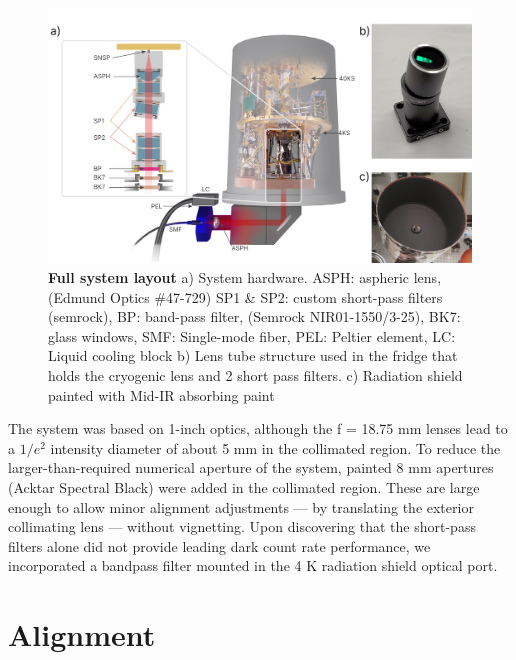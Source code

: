 \documentclass[11pt]{caltech_thesis} %
\begin{document}
\hypertarget{fig:setup}{%
\begin{figure}
\centering
\includegraphics[width=1\textwidth,height=\textheight]{./chapter_02/figs/dcrmin_layout_light.png}
\caption[{Full system layout}]{\textbf{Full system layout} a) System hardware. ASPH: aspheric lens, (Edmund Optics \#47-729)
SP1 \& SP2: custom short-pass filters (semrock), BP: band-pass filter, (Semrock NIR01-1550/3-25), BK7: glass windows, SMF: Single-mode fiber, PEL: Peltier element, LC: Liquid cooling block b) Lens tube structure used in the fridge that holds the cryogenic lens and 2 short pass filters. c) Radiation shield painted with Mid-IR absorbing paint}
\label{fig:setup}
\end{figure}
}

The system was based on 1-inch optics, although the f = 18.75 mm lenses lead to a $1/e^2$ intensity diameter of about 5 mm in the collimated region. To reduce the larger-than-required numerical aperture of the system, painted 8 mm apertures (Acktar Spectral Black) were added in the collimated region. These are large enough to allow minor alignment adjustments --- by translating the exterior collimating lens --- without vignetting. Upon discovering that the short-pass filters alone did not provide leading dark count rate performance, we incorporated a bandpass filter mounted in the 4 K radiation shield optical port.

\hypertarget{alignment}{%
\section{Alignment}\label{alignment}}
\end{document}
